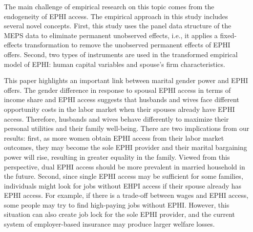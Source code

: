 \documentclass[legno,11pt]{article}
\begin{document}
The main challenge of empirical research on this topic comes from
the endogeneity of EPHI access. The empirical approach in this study
includes several novel concepts. First, this study uses the panel
data structure of the MEPS data to eliminate permanent unobserved
effects, i.e., it applies a fixed-effects transformation to remove
the unobserved permanent effects of EPHI offers. Second, two types
of instruments are used in the transformed empirical model of EPHI:
human capital variables and spouse's firm characteristics.
\par

This paper highlights an important link between marital gender power
and EPHI offers. The gender difference in response to spousal EPHI
access in terms of income share and EPHI access suggests that
husbands and wives face different opportunity costs in the labor
market when their spouses already have EPHI access. Therefore,
husbands and wives behave differently to maximize their personal
utilities and their family well-being. There are two implications
from our results: first, as more women obtain EPHI access from their
labor market outcomes, they may become the sole EPHI provider and
their marital bargaining power will rise, resulting in greater
equality in the family. Viewed from this perspective, dual EPHI
access should be more prevalent in married household in the future.
Second, since single EPHI access may be sufficient for some
families, individuals might look for jobs without EHPI access if
their spouse already has EPHI access. For example, if there is a
trade-off between wages and EPHI access, some people may try to find
high-paying jobs without EPHI. However, this situation can also
create job lock for the sole EPHI provider, and the current system
of employer-based insurance may produce larger welfare losses.
\par
\end{document}

